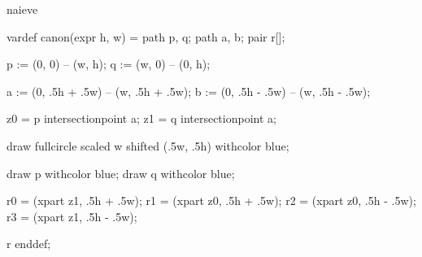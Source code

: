

\startenvironment naieve

	\setuppagenumbering[alternative=singlesided]

	\startMPdefinitions
		vardef canon(expr h, w) =
			path p, q;
			path a, b;
			pair r[];

			p := (0, 0) -- (w, h);
			q := (w, 0) -- (0, h);

			a := (0, .5h + .5w) -- (w, .5h + .5w); %
			b := (0, .5h - .5w) -- (w, .5h - .5w); %

			z0 = p intersectionpoint a; %
			z1 = q intersectionpoint a; %

			draw fullcircle scaled w shifted (.5w, .5h) withcolor blue;

			draw p withcolor blue;
			draw q withcolor blue;


			r0 = (xpart z1, .5h + .5w); %
			r1 = (xpart z0, .5h + .5w); %
			r2 = (xpart z0, .5h - .5w); %
			r3 = (xpart z1, .5h - .5w); %

			r
		enddef;
	\stopMPdefinitions

\stopenvironment

